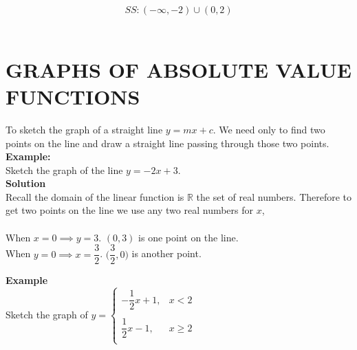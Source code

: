 \documentclass[11pt,a4paper]{article}
\begin{document}
$$SS:(-\infty,-2)\cup (0,2)$$\\




















\pagebreak
\section{GRAPHS OF ABSOLUTE VALUE FUNCTIONS}
To sketch the graph of a straight line $y=mx+c$. We need only to find two points on the line and draw a straight line passing through those two points.\\

\textbf{Example:}\\
Sketch the graph of the line $y=-2x+3$.\\

\textbf{Solution}\\
Recall the domain of the linear function is $\mathbb{R}$ the set of real numbers. Therefore to get two points on the line we use any two real numbers for $x$,\\\\
When $x=0\implies y=3$. $(0,3)$ is one point on the line.\\
When $y=0\implies x=\dfrac{3}{2}$. $\bigg(\dfrac{3}{2},0\bigg)$ is another point.


\begin{figure}[H]
\centering
{}
\end{figure}




\textbf{Example}\\
Sketch the graph of $y=
\begin{cases}
-\dfrac{1}{2}x+1, &x<2\\\\
\dfrac{1}{2}x-1, & x\geq 2\\
\end{cases}
$\\\\
\vspace{0.2cm}
\end{document}
